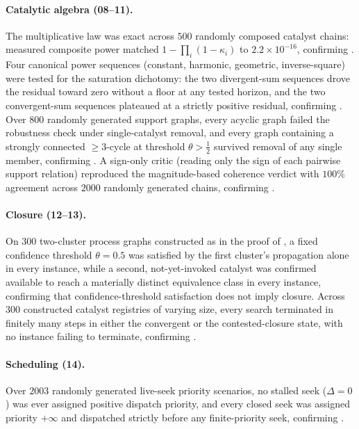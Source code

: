 \documentclass[11pt,twocolumn,a4paper]{article}
\theoremstyle{thmstyle}
\theoremstyle{definition}
\theoremstyle{remark}
\newcommand{\pot}{\kappa}
\begin{document}
\paragraph{Catalytic algebra (08--11).}
The multiplicative law was exact across $500$ randomly composed catalyst
chains: measured composite power matched
$1-\prod_i(1-\pot_i)$ to $2.2\times10^{-16}$, confirming
. Four canonical power sequences (constant,
harmonic, geometric, inverse-square) were tested for the saturation
dichotomy: the two divergent-sum sequences drove the residual toward zero
without a floor at any tested horizon, and the two convergent-sum
sequences plateaued at a strictly positive residual, confirming
. Over $800$ randomly generated support graphs,
every acyclic graph failed the robustness check under single-catalyst
removal, and every graph containing a strongly connected $\ge3$-cycle at
threshold $\theta>\tfrac12$ survived removal of any single member,
confirming . A sign-only critic (reading only the sign
of each pairwise support relation) reproduced the magnitude-based
coherence verdict with $100\%$ agreement across $2000$ randomly generated
chains, confirming .

\paragraph{Closure (12--13).}
On $300$ two-cluster process graphs constructed as in the proof of
, a fixed confidence threshold $\theta=0.5$ was
satisfied by the first cluster's propagation alone in every instance,
while a second, not-yet-invoked catalyst was confirmed available to reach
a materially distinct equivalence class in every instance, confirming
that confidence-threshold satisfaction does not imply closure. Across
$300$ constructed catalyst registries of varying size, every search
terminated in finitely many steps in either the convergent or the
contested-closure state, with no instance failing to terminate, confirming
.

\paragraph{Scheduling (14).}
Over $2003$ randomly generated live-seek priority scenarios, no stalled
seek ($\Delta=0$) was ever assigned positive dispatch priority, and every
closed seek was assigned priority $+\infty$ and dispatched strictly before
any finite-priority seek, confirming .
\end{document}
